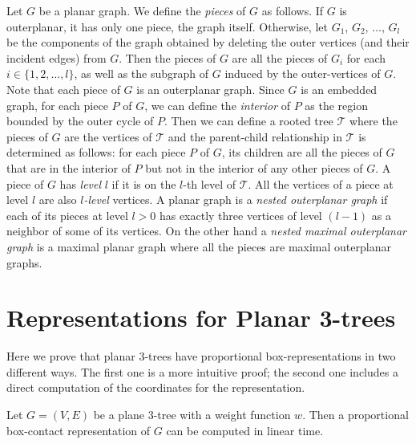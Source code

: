 \documentclass{llncs}
\begin{document}
Let $G$ be a planar graph. We define the \textit{pieces} of $G$ as follows. If $G$ is
 outerplanar, it has only one piece, the graph itself. Otherwise, let $G_1$, $G_2$, $\ldots$,
 $G_l$ be the components of the graph obtained by deleting the outer vertices (and their
 incident edges) from $G$. Then the pieces of $G$ are all the pieces of $G_i$ for each
 $i\in\{1, 2, \ldots, l\}$, as well as the subgraph of $G$ induced by the outer-vertices
 of $G$. Note that each piece of $G$ is an outerplanar graph. Since $G$ is an
 embedded graph, for each piece $P$ of $G$, we can define the \textit{interior} of $P$
 as the region bounded by the outer cycle of $P$. Then we can define a rooted tree
 $\mathcal{T}$ where the pieces of $G$ are the vertices of $\mathcal{T}$ and the
 parent-child relationship in $\mathcal{T}$ is determined as follows: for each piece
 $P$ of $G$, its children are all the pieces of $G$ that are in the interior of $P$ but
 not in the interior of any other pieces of $G$. A piece of $G$ has \textit{level} $l$
 if it is on the $l$-th level of $\mathcal{T}$. All the vertices of a piece
 at level $l$ are also \textit{$l$-level} vertices. A planar graph is a \textit{nested outerplanar
 graph} if each of its pieces at level $l>0$ has exactly three vertices of level $(l-1)$ as
 a neighbor of some of its vertices. On the other hand a \textit{nested maximal outerplanar
 graph} is a maximal planar graph where all the pieces are maximal outerplanar graphs.


 








\section{Representations for Planar 3-trees}


Here we prove that planar 3-trees have proportional box-representations in two different ways.
The first one is a more intuitive proof; the second one includes a direct computation of the coordinates
for the representation.


\begin{theorem}
\label{th:p3t-box} Let $G=(V, E)$ be a plane 3-tree with a weight function $w$. Then a
 proportional box-contact representation of $G$ can be computed in linear time.
\end{theorem}
\end{document}
